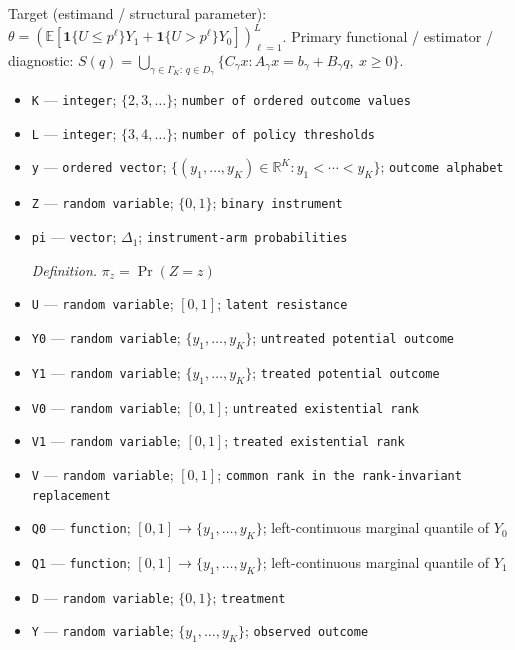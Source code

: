 \documentclass{article}
\begin{document}
Target (estimand / structural parameter): \(\theta=(\mathbb E[\mathbf 1\{U\le p^\ell\}Y_1+\mathbf 1\{U>p^\ell\}Y_0])_{\ell=1}^L\).
Primary functional / estimator / diagnostic: \(S(q)=\bigcup_{\gamma\in\Gamma_K:\,q\in D_\gamma}\{C_\gamma x:A_\gamma x=b_\gamma+B_\gamma q,\ x\ge0\}\).
\begin{itemize}
  \item \texttt{K} --- \texttt{integer}; \(\{2,3,\ldots\}\); \texttt{number of ordered outcome values}
  \item \texttt{L} --- \texttt{integer}; \(\{3,4,\ldots\}\); \texttt{number of policy thresholds}
  \item \texttt{y} --- \texttt{ordered vector}; \(\{(y_1,\ldots,y_K)\in\mathbb R^K:y_1<\cdots<y_K\}\); \texttt{outcome alphabet}
  \item \texttt{Z} --- \texttt{random variable}; \(\{0,1\}\); \texttt{binary instrument}
  \item \texttt{pi} --- \texttt{vector}; \(\Delta_1\); \texttt{instrument-\allowbreak{}arm probabilities}
  \par\smallskip\noindent\emph{Definition.} \(\pi_z=\Pr(Z=z)\)
  \item \texttt{U} --- \texttt{random variable}; \([0,1]\); \texttt{latent resistance}
  \item \texttt{Y0} --- \texttt{random variable}; \(\{y_1,\ldots,y_K\}\); \texttt{untreated potential outcome}
  \item \texttt{Y1} --- \texttt{random variable}; \(\{y_1,\ldots,y_K\}\); \texttt{treated potential outcome}
  \item \texttt{V0} --- \texttt{random variable}; \([0,1]\); \texttt{untreated existential rank}
  \item \texttt{V1} --- \texttt{random variable}; \([0,1]\); \texttt{treated existential rank}
  \item \texttt{V} --- \texttt{random variable}; \([0,1]\); \texttt{common rank in the rank-\allowbreak{}invariant replacement}
  \item \texttt{Q0} --- \texttt{function}; \([0,1]\to\{y_1,\ldots,y_K\}\); left-continuous marginal quantile of \(Y_0\)
  \item \texttt{Q1} --- \texttt{function}; \([0,1]\to\{y_1,\ldots,y_K\}\); left-continuous marginal quantile of \(Y_1\)
  \item \texttt{D} --- \texttt{random variable}; \(\{0,1\}\); \texttt{treatment}
  \item \texttt{Y} --- \texttt{random variable}; \(\{y_1,\ldots,y_K\}\); \texttt{observed outcome}

\end{itemize}
\end{document}
